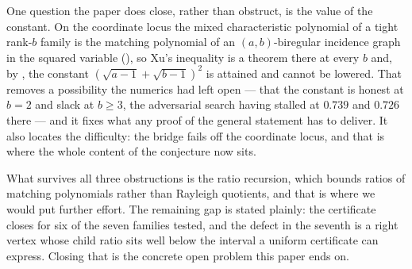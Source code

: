\documentclass[11pt]{article}
\theoremstyle{remark}
\begin{document}
One question the paper does close, rather than obstruct, is the value of the constant. On the
coordinate locus the mixed characteristic polynomial of a tight rank-$b$ family is the matching
polynomial of an $(a,b)$-biregular incidence graph in the squared variable
(\cite{Supp2}), so Xu's inequality is a theorem there at every $b$ and, by
\cite{Supp2}, the constant $(\sqrt{a-1}+\sqrt{b-1})^2$ is attained and cannot
be lowered. That removes a possibility the numerics had left open --- that the constant is honest
at $b=2$ and slack at $b\ge3$, the adversarial search having stalled at $0.739$ and $0.726$ there
--- and it fixes what any proof of the general statement has to deliver. It also locates the
difficulty: the bridge fails off the coordinate locus, and that is where the whole content of the
conjecture now sits.

What survives all three obstructions is the ratio recursion, which bounds ratios of matching
polynomials rather than Rayleigh quotients, and that is where we would put further effort. The remaining gap is
stated plainly: the certificate closes for six of the seven families tested, and the defect in the
seventh is a right vertex whose child ratio sits well below the interval a uniform certificate can
express. Closing that is the concrete open problem this paper ends on.
\end{document}
